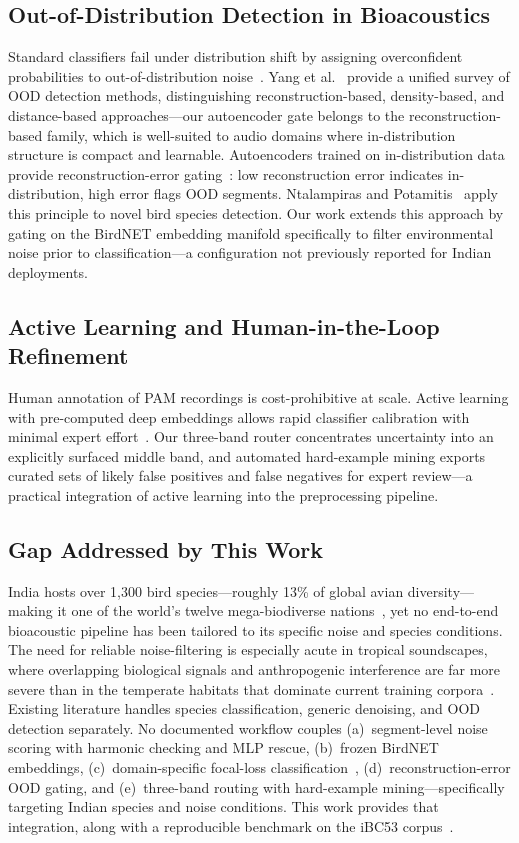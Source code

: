 \documentclass[conference]{IEEEtran}
\begin{document}
\subsection{Out-of-Distribution Detection in Bioacoustics}
Standard classifiers fail under distribution shift by assigning overconfident probabilities to out-of-distribution noise~\cite{Wood2024}. Yang et al.~\cite{Yang2024} provide a unified survey of OOD detection methods, distinguishing reconstruction-based, density-based, and distance-based approaches---our autoencoder gate belongs to the reconstruction-based family, which is well-suited to audio domains where in-distribution structure is compact and learnable. Autoencoders trained on in-distribution data provide reconstruction-error gating~\cite{Hinton2006}: low reconstruction error indicates in-distribution, high error flags OOD segments. Ntalampiras and Potamitis~\cite{Ntalampiras2021} apply this principle to novel bird species detection. Our work extends this approach by gating on the BirdNET embedding manifold specifically to filter environmental noise prior to classification---a configuration not previously reported for Indian deployments.

\subsection{Active Learning and Human-in-the-Loop Refinement}
Human annotation of PAM recordings is cost-prohibitive at scale. Active learning with pre-computed deep embeddings allows rapid classifier calibration with minimal expert effort~\cite{Kath2024,Rauch2024,Dumoulin2025}. Our three-band router concentrates uncertainty into an explicitly surfaced middle band, and automated hard-example mining exports curated sets of likely false positives and false negatives for expert review---a practical integration of active learning into the preprocessing pipeline.

\subsection{Gap Addressed by This Work}
India hosts over 1,300 bird species---roughly 13\% of global avian diversity---making it one of the world's twelve mega-biodiverse nations~\cite{Grimmett2016}, yet no end-to-end bioacoustic pipeline has been tailored to its specific noise and species conditions. The need for reliable noise-filtering is especially acute in tropical soundscapes, where overlapping biological signals and anthropogenic interference are far more severe than in the temperate habitats that dominate current training corpora~\cite{Rasmussen2024,Kershenbaum2025}. Existing literature handles species classification, generic denoising, and OOD detection separately. No documented workflow couples (a)~segment-level noise scoring with harmonic checking and MLP rescue, (b)~frozen BirdNET embeddings, (c)~domain-specific focal-loss classification~\cite{Lin2017}, (d)~reconstruction-error OOD gating, and (e)~three-band routing with hard-example mining---specifically targeting Indian species and noise conditions. This work provides that integration, along with a reproducible benchmark on the iBC53 corpus~\cite{iBC53}.
\end{document}
